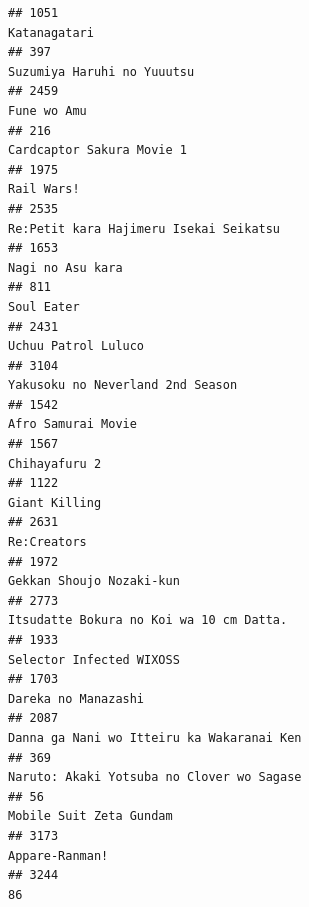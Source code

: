 \documentclass[
]{article}
\begin{document}
\begin{verbatim}
## 1051                                                                                              Katanagatari
## 397                                                                                 Suzumiya Haruhi no Yuuutsu
## 2459                                                                                               Fune wo Amu
## 216                                                                                  Cardcaptor Sakura Movie 1
## 1975                                                                                                Rail Wars!
## 2535                                                                    Re:Petit kara Hajimeru Isekai Seikatsu
## 1653                                                                                          Nagi no Asu kara
## 811                                                                                                 Soul Eater
## 2431                                                                                       Uchuu Patrol Luluco
## 3104                                                                          Yakusoku no Neverland 2nd Season
## 1542                                                                                        Afro Samurai Movie
## 1567                                                                                             Chihayafuru 2
## 1122                                                                                             Giant Killing
## 2631                                                                                               Re:Creators
## 1972                                                                                  Gekkan Shoujo Nozaki-kun
## 2773                                                                   Itsudatte Bokura no Koi wa 10 cm Datta.
## 1933                                                                                  Selector Infected WIXOSS
## 1703                                                                                       Dareka no Manazashi
## 2087                                                                 Danna ga Nani wo Itteiru ka Wakaranai Ken
## 369                                                                  Naruto: Akaki Yotsuba no Clover wo Sagase
## 56                                                                                     Mobile Suit Zeta Gundam
## 3173                                                                                            Appare-Ranman!
## 3244                                                                                                        86

\end{verbatim}
\end{document}
